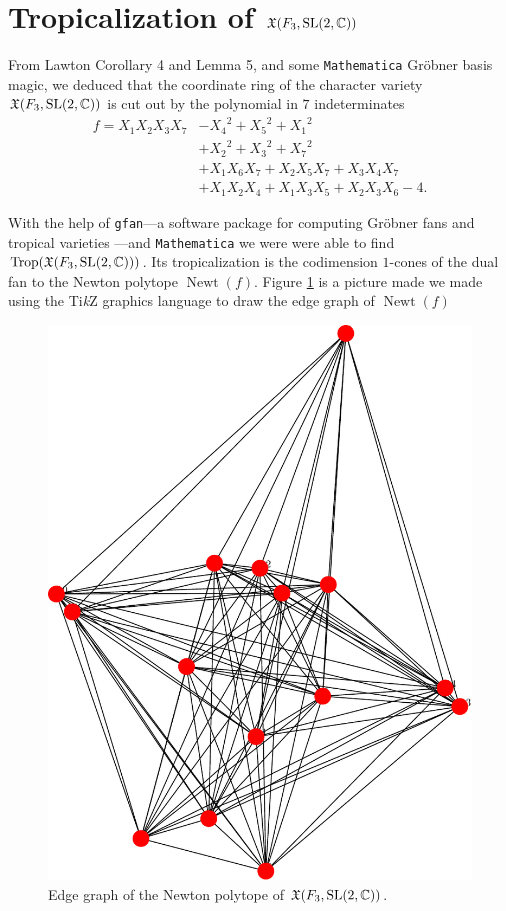 \documentclass[11pt]{article}
\DeclareMathOperator{\Newt}{Newt}
\begin{document}
\section{Tropicalization of $\mathfrak{X}(F_3,\mathrm{SL}(2,\mathbb{C}))$}
From Lawton \cite{0601132} Corollary 4 and Lemma 5, and some
\texttt{Mathematica} Gröbner basis magic, we deduced that the coordinate
ring of the character variety $\mathfrak{X}(F_3,\mathrm{SL}(2,\mathbb{C}))$ is cut out by the
polynomial in $7$ indeterminates
\begin{equation}
  \label{eq:f3-sl2c}
  \begin{aligned}
    f=X_1X_2X_3X_7&-{X_4}^2+{X_5}^2+{X_1}^2\\
    &+{X_2}^2+{X_3}^2+{X_7}^2\\
    &+X_1X_6X_7+X_2X_5X_7+X_3X_4X_7\\
    &+X_1X_2X_4+X_1X_3X_5+X_2X_3X_6-4.
  \end{aligned}
\end{equation}

With the help of \texttt{gfan}---a software package for computing Gröbner
fans and tropical varieties \cite{gfan}---and \texttt{Mathematica} we were
were able to find $\operatorname{Trop}(\mathfrak{X}(F_3,\mathrm{SL}(2,\mathbb{C})))$. Its tropicalization is
the codimension $1$-cones of the dual fan to the Newton polytope
$\Newt(f)$. Figure \ref{fig:f3-sl2c} is a picture made we made using the
Ti\textit{k}Z graphics language to draw the edge graph of $\Newt(f)$

\begin{figure}[htpb]
  \centering
  \includegraphics[scale=.25]{smallgraph}
  \caption{Edge graph of the Newton polytope of $\mathfrak{X}(F_3,\mathrm{SL}(2,\mathbb{C}))$.}
\label{fig:f3-sl2c}
\end{figure}
\end{document}
